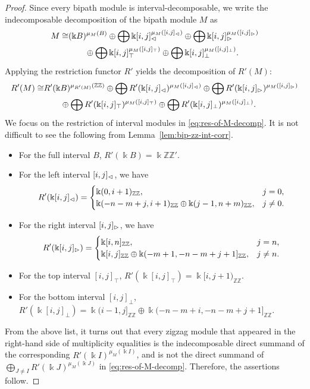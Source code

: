 \documentclass[a4paper,english,reqno]{amsart}
\renewcommand\k{\Bbbk}
\newcommand\iso{\cong}
\newcommand\ZZ{\mathbb{ZZ}}
\newcommand\ds{\oplus}
\newcommand\DS{\bigoplus\limits}
\theoremstyle{plain}
\theoremstyle{definition} %
\newcommand{\slice}[1]{{#1}'} %
\begin{document}
\begin{proof}
Since every bipath module is interval-decomposable, we write the indecomposable decomposition of the bipath module $M$ as
\begin{align*}
    M \iso & (\k B)^{\mu_M(B)}\ds \DS\k [i, j]_{\lefti}^{\mu_M([i, j]_{\lefti})} \ds \DS\k [i, j]_{\righti}^{\mu_M([i, j]_{\righti})}\\
    &\quad\quad \ds \DS\k [i, j]_{\top}^{\mu_M([i, j]_{\top})}\ds \DS\k [i, j]_{\bot}^{\mu_M([i, j]_{\bot})}.
\end{align*}
Applying the restriction functor $\slice{R}$ yields the decomposition of $\slice{R}(M)$:
\begin{align}\label{eq:res-of-M-decomp}
    \slice{R}(M) \iso & \slice{R}(\k B)^{\mu_{\slice{R}(M)}(\ZZ)}\ds \DS \slice{R}(\k [i, j]_{\lefti})^{\mu_M([i, j]_{\lefti})} \ds \DS \slice{R}(\k [i, j]_{\righti})^{\mu_M([i, j]_{\righti})}\nonumber\\
    &\quad\quad \ds \DS \slice{R}(\k [i, j]_{\top})^{\mu_M([i, j]_{\top})}\ds \DS \slice{R}(\k [i, j]_{\bot})^{\mu_M([i, j]_{\bot})}.
\end{align}
We focus on the restriction of interval modules in \eqref{eq:res-of-M-decomp}. It is not difficult to see the following from Lemma~\ref{lem:bip-zz-int-corr}.
\begin{itemize}
\item For the full interval $B$, $\slice{R}(\k B) = \k \slice{\ZZ}$.
\item For the left interval $[i, j]_{\vartriangleleft}$, we have
\[
\slice{R}(\k [i, j]_{\lefti}) = \begin{cases}
\k (0, i+1)_{\ZZ}, & j = 0,\\
\k (-n-m+j, i+1)_{\ZZ}\ds \k (j-1, n+m)_{\ZZ}, & j \neq 0.
\end{cases}
\]
\item For the right interval $[i, j]_{\vartriangleright}$, we have
\[
\slice{R}(\k [i, j]_{\righti}) = \begin{cases}
\k [i, n]_{\ZZ}, & j = n,\\
\k [i, j]_{\ZZ}\ds \k (-m+1, -n-m+j+1]_{\ZZ}, & j \neq n.
\end{cases}
\]
\item For the top interval $[i,j]_{\top}$, $\slice{R}(\k [i,j]_{\top}) = \k [i,j+1)_{\ZZ}$.
\item For the bottom interval $[i,j]_{\bot}$, $\slice{R}(\k [i,j]_{\bot}) = \k (i-1,j]_{\ZZ}\ds \k (-n-m+i, -n-m+j+1]_{\ZZ}$.
\end{itemize}

From the above list, it turns out that every zigzag module that appeared in the right-hand side of multiplicity equalities is the indecomposable direct summand of the corresponding $\slice{R}(\k I)^{\mu_M(\k I)}$, and is not the direct summand of $\DS_{J\neq I} \slice{R}(\k J)^{\mu_M(\k J)}$ in \eqref{eq:res-of-M-decomp}. Therefore, the assertions follow.
\end{proof}
\end{document}
